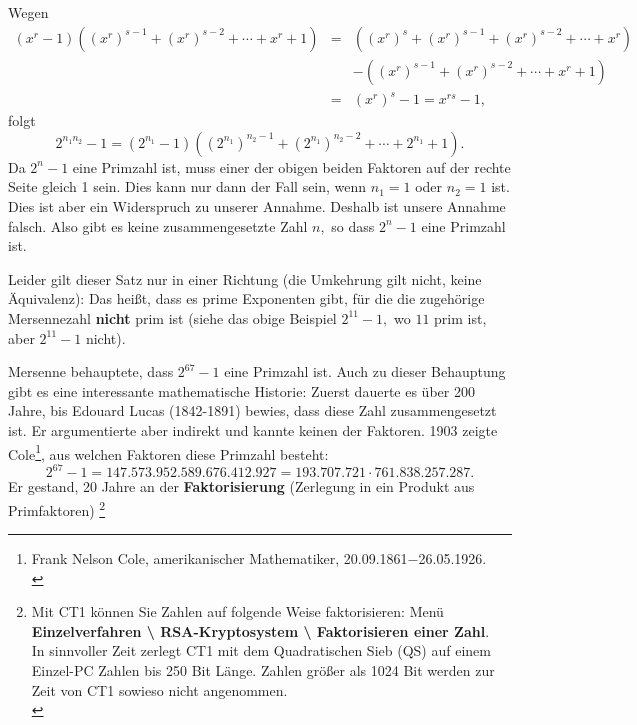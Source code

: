 \begin{refsegment}
\begin{Beweis}{}
Wegen
\begin{eqnarray*}
(x^r-1)((x^r)^{s-1} + (x^r)^{s-2} + \cdots + x^r +1) & = &  ((x^r)^s + (x^r)^{s-1} + (x^r)^{s-2} + \cdots + x^r) \\
&  & -((x^r)^{s-1} + (x^r)^{s-2} + \cdots + x^r +1)  \\
& = & (x^r)^s -1 = x^{rs } -1,
\end{eqnarray*}
folgt
\[ 2^{n_1 n_2} - 1 = (2^{n_1} -1)((2^{n_1})^{n_2 -1} + (2^{n_1})^{n_2 -2} + \cdots + 2^{n_1} + 1). \]
Da $ 2^n - 1 $ eine Primzahl ist, muss einer der obigen beiden
Faktoren auf der rechte Seite gleich 1 sein. Dies kann nur dann
der Fall sein, wenn $ n_1 =1 $ oder $ n_2 =1$ ist. Dies ist aber
ein Widerspruch zu unserer Annahme. Deshalb ist unsere Annahme
falsch. Also gibt es keine zusammengesetzte Zahl $ n, $ so dass $
2^n -1 $ eine Primzahl ist.
\end{Beweis}

\hypertarget{Mer-nums-not-always-prim}{}
Leider gilt dieser Satz nur in einer Richtung (die Umkehrung gilt
nicht, keine Äquivalenz): Das heißt, dass es prime Exponenten gibt,
für die die zugehörige Mersennezahl \textbf{nicht} prim ist (siehe das
obige Beispiel $2^{11}-1, $ wo $11$ prim ist, aber $2^{11}-1$ nicht).

Mersenne behauptete, dass $2^{67}-1$ eine Primzahl ist. Auch zu
dieser Behauptung gibt es eine interessante mathematische Historie:
Zuerst dauerte es über 200 Jahre, bis 
Edouard Lucas (1842-1891) bewies, dass diese Zahl zusammengesetzt
ist. Er argumentierte aber indirekt und kannte keinen der
Faktoren. 1903 zeigte Cole\footnote{%
Frank Nelson Cole, amerikanischer Mathematiker, 20.09.1861$-$26.05.1926.\\
},
aus welchen Faktoren diese Primzahl besteht:
$$ 2^{67} -1
=147. 573. 952. 589. 676. 412. 927 = 193. 707. 721 \cdot 761. 838. 257. 287. $$
Er gestand, 20 Jahre an der \textbf{Faktorisierung} 
(Zerlegung in ein Produkt aus Primfaktoren)%
\footnote{%
  Mit CT1 können Sie Zahlen auf folgende Weise
  faktorisieren: Menü \textbf{Einzelverfahren \textbackslash{} RSA-Kryptosystem
  \textbackslash{} Faktorisieren einer Zahl}. \\
  In sinnvoller Zeit zerlegt CT1 mit dem Quadratischen Sieb (QS)
  auf einem Einzel-PC Zahlen bis 250 Bit Länge. Zahlen größer
  als 1024 Bit werden zur Zeit von CT1 sowieso nicht angenommen.\\

}
\end{refsegment}
